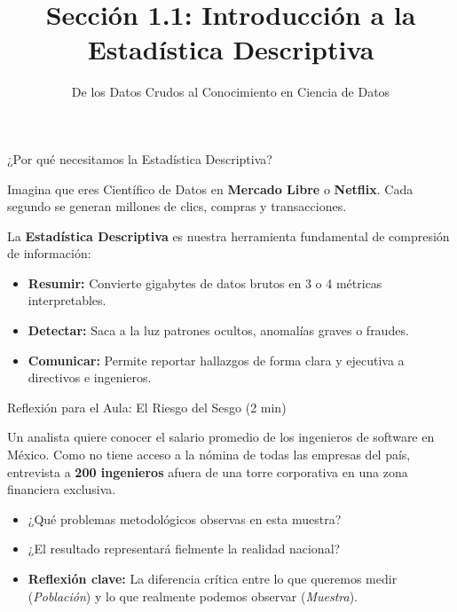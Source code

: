 


\title[Estadística Descriptiva]{Sección 1.1: Introducción a la Estadística Descriptiva}
\subtitle{De los Datos Crudos al Conocimiento en Ciencia de Datos}



\begin{frame}
  \titlepage
\end{frame}

\begin{frame}{¿Por qué necesitamos la Estadística Descriptiva?}
  \begin{motivacion}
    Imagina que eres Científico de Datos en \textbf{Mercado Libre} o \textbf{Netflix}. Cada segundo se generan millones de clics, compras y transacciones.
  \end{motivacion}
  
  \vspace{0.6em}
  La \textbf{Estadística Descriptiva} es nuestra herramienta fundamental de compresión de información:
  \begin{itemize}
    \item \textbf{Resumir:} Convierte gigabytes de datos brutos en 3 o 4 métricas interpretables. \pause
    \item \textbf{Detectar:} Saca a la luz patrones ocultos, anomalías graves o fraudes. \pause
    \item \textbf{Comunicar:} Permite reportar hallazgos de forma clara y ejecutiva a directivos e ingenieros.
  \end{itemize}
\end{frame}

\begin{frame}{Reflexión para el Aula: El Riesgo del Sesgo (2 min)}
  \begin{reflexion}
    Un analista quiere conocer el salario promedio de los ingenieros de software en México. Como no tiene acceso a la nómina de todas las empresas del país, entrevista a \textbf{200 ingenieros} afuera de una torre corporativa en una zona financiera exclusiva.
  \end{reflexion}
  
  \vspace{0.8em}
  \pause
  \begin{itemize}
    \item ¿Qué problemas metodológicos observas en esta muestra? \pause
    \item ¿El resultado representará fielmente la realidad nacional? \pause
    \item \textbf{Reflexión clave:} La diferencia crítica entre lo que queremos medir (\emph{Población}) y lo que realmente podemos observar (\emph{Muestra}).
  \end{itemize}
\end{frame}

